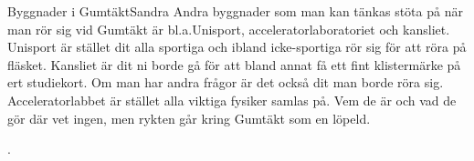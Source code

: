 \documentclass{spektraklet}
\begin{document}
\begin{artikel}{Byggnader i Gumtäkt}{Sandra}
Andra byggnader som man kan tänkas stöta på när man rör sig vid Gumtäkt är bl.a.Unisport, acceleratorlaboratoriet och kansliet. Unisport är stället dit alla sportiga och ibland
icke-sportiga rör sig för att röra på fläsket. Kansliet är dit ni borde gå för att bland annat få ett fint klistermärke på ert studiekort. Om man har andra frågor är det också dit man borde röra sig. Acceleratorlabbet är stället alla viktiga fysiker samlas på. Vem de är och vad de gör där vet ingen, men rykten går kring Gumtäkt som en löpeld.


\end{artikel}

\newpage

.








\end{document}
